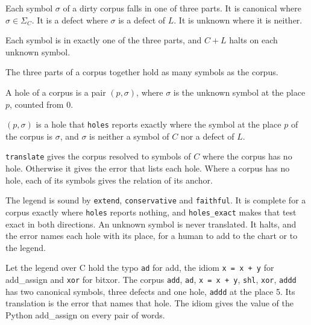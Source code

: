 Each symbol $\sigma$ of a dirty corpus falls in one of three parts. It is canonical where $\sigma \in \Sigma_C$.
It is a defect where $\sigma$ is a defect of $L$. It is unknown where it is neither.

\begin{theorem}
Each symbol is in exactly one of the three parts, and $C + L$ halts on each unknown symbol.
\end{theorem}

\begin{theorem}
The three parts of a corpus together hold as many symbols as the corpus.
\end{theorem}

\begin{definition}
A hole of a corpus is a pair $(p, \sigma)$, where $\sigma$ is the unknown symbol at the place $p$, counted from 0.
\end{definition}

\begin{theorem}
$(p, \sigma)$ is a hole that \texttt{holes} reports exactly where the symbol at the place $p$ of the corpus is
$\sigma$, and $\sigma$ is neither a symbol of $C$ nor a defect of $L$.
\end{theorem}

\begin{theorem}
\texttt{translate} gives the corpus resolved to symbols of $C$ where the corpus has no hole. Otherwise it gives the
error that lists each hole. Where a corpus has no hole, each of its symbols gives the relation of its anchor.
\end{theorem}

The legend is sound by \texttt{extend}, \texttt{conservative} and \texttt{faithful}. It is complete for a corpus
exactly where \texttt{holes} reports nothing, and \texttt{holes\_exact} makes that test exact in both directions.
An unknown symbol is never translated. It halts, and the error names each hole with its place, for a human to add
to the chart or to the legend.

\begin{proposition}
Let the legend over C hold the typo \texttt{ad} for add, the idiom \texttt{x = x + y} for add\_assign and
\texttt{xor} for bitxor. The corpus \texttt{add}, \texttt{ad}, \texttt{x = x + y}, \texttt{shl}, \texttt{xor},
\texttt{addd} has two canonical symbols, three defects and one hole, \texttt{addd} at the place 5. Its translation
is the error that names that hole. The idiom gives the value of the Python add\_assign on every pair of words.
\end{proposition}

